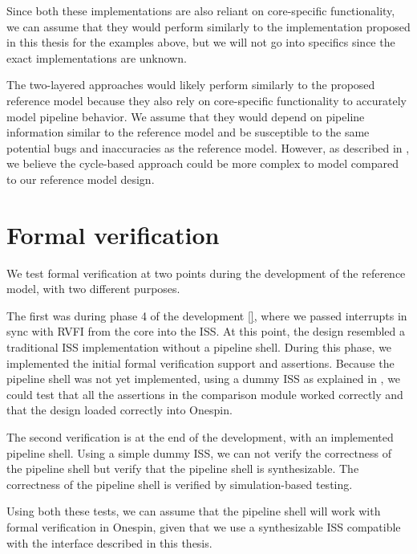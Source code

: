 Since both these implementations are also reliant on core-specific functionality, we can assume that they would perform similarly to the implementation proposed in this thesis for the examples above, but we will not go into specifics since the exact implementations are unknown.

The two-layered approaches would likely perform similarly to the proposed reference model because they also rely on core-specific functionality to accurately model pipeline behavior. We assume that they would depend on pipeline information similar to the reference model and be susceptible to the same potential bugs and inaccuracies as the reference model. However, as described in , we believe the cycle-based approach could be more complex to model compared to our reference model design.





\section{Formal verification}
\label{sec:res_formal}

We test formal verification at two points during the development of the reference model, with two different purposes.

The first was during phase 4 of the development \ref{}, where we passed interrupts in sync with RVFI from the core into the ISS. At this point, the design resembled a traditional ISS implementation without a pipeline shell. During this phase, we implemented the initial formal verification support and assertions. Because the pipeline shell was not yet implemented, using a dummy ISS as explained in , we could test that all the assertions in the comparison module worked correctly and that the design loaded correctly into Onespin. 

The second verification is at the end of the development, with an implemented pipeline shell. Using a simple dummy ISS, we can not verify the correctness of the pipeline shell but verify that the pipeline shell is synthesizable. The correctness of the pipeline shell is verified by simulation-based testing.

Using both these tests, we can assume that the pipeline shell will work with formal verification in Onespin, given that we use a synthesizable ISS compatible with the interface described in this thesis.